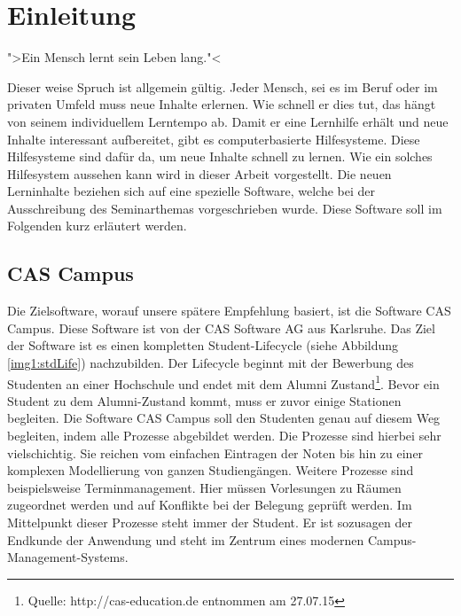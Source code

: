 
\chapter{Einleitung}
\label{ch:Introduction}
">Ein Mensch lernt sein Leben lang."< \par

Dieser weise Spruch ist allgemein gültig. Jeder Mensch, sei es im Beruf oder im privaten Umfeld muss neue Inhalte erlernen. Wie schnell er dies tut, das hängt von seinem individuellem Lerntempo ab. Damit er eine Lernhilfe erhält und neue Inhalte interessant aufbereitet, gibt es computerbasierte Hilfesysteme. Diese Hilfesysteme sind dafür da, um neue Inhalte schnell zu lernen. Wie ein solches Hilfesystem aussehen kann wird in dieser Arbeit vorgestellt. Die neuen Lerninhalte beziehen sich auf eine spezielle Software, welche bei der Ausschreibung des Seminarthemas vorgeschrieben wurde. Diese Software soll im Folgenden kurz erläutert werden.




\section{CAS Campus}
Die Zielsoftware, worauf unsere spätere Empfehlung basiert, ist die Software CAS Campus. Diese Software ist von der CAS Software AG aus Karlsruhe. Das Ziel der Software ist es einen kompletten Student-Lifecycle (siehe Abbildung \ref{img1:stdLife}) nachzubilden. Der Lifecycle beginnt mit der Bewerbung des Studenten an einer Hochschule und endet mit dem Alumni Zustand\footnote{Quelle: http://cas-education.de entnommen am 27.07.15}. Bevor ein Student zu dem Alumni-Zustand kommt, muss er zuvor einige Stationen begleiten. Die Software CAS Campus soll den Studenten genau auf diesem Weg begleiten, indem alle Prozesse abgebildet werden. Die Prozesse sind hierbei sehr vielschichtig. Sie reichen vom einfachen Eintragen der Noten bis hin zu einer komplexen Modellierung von ganzen Studiengängen. Weitere Prozesse sind beispielsweise Terminmanagement. Hier müssen Vorlesungen zu Räumen zugeordnet werden und auf Konflikte bei der Belegung geprüft werden. Im Mittelpunkt dieser Prozesse steht immer der Student. Er ist sozusagen der Endkunde der Anwendung und steht im Zentrum eines modernen Campus-Management-Systems. \cite{becker2008a}\par



